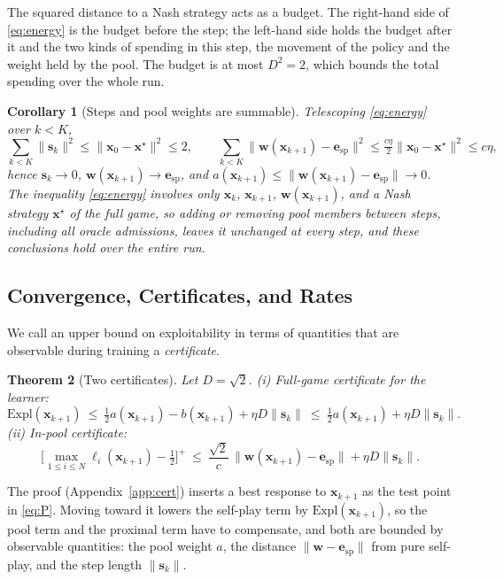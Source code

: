 \documentclass{article}
\theoremstyle{plain}
\newtheorem{theorem}{Theorem}[section]
\newtheorem{corollary}[theorem]{Corollary}
\theoremstyle{remark}
\newcommand{\Expl}{\mathrm{Expl}}
\newcommand{\bx}{{\bm{x}}}
\newcommand{\bw}{{\bm{w}}}
\newcommand{\be}{{\bm{e}}}
\newcommand{\xs}{\bx^{\star}}
\newcommand{\dx}{{\bm{s}}}
\newcommand{\esp}{\be_{\mathrm{sp}}}
\begin{document}
The squared distance to a Nash strategy acts as a budget. The right-hand side of \eqref{eq:energy} is the budget before the step; the left-hand side holds the budget after it and the two kinds of spending in this step, the movement of the policy and the weight held by the pool. The budget is at most $D^2=2$, which bounds the total spending over the whole run.

\begin{corollary}[Steps and pool weights are summable]
\label{cor:sum}
Telescoping \eqref{eq:energy} over $k<K$,
\[
\textstyle\sum_{k<K}\|\dx_k\|^2\le\|\bx_0-\xs\|^2\le2,\qquad
\sum_{k<K}\|\bw(\bx_{k+1})-\esp\|^2\le\tfrac{c\eta}2\|\bx_0-\xs\|^2\le c\eta ,
\]
hence $\dx_k\to0$, $\bw(\bx_{k+1})\to \esp$, and $a(\bx_{k+1})\le\|\bw(\bx_{k+1})-\esp\|\to0$. The inequality \eqref{eq:energy} involves only $\bx_k$, $\bx_{k+1}$, $\bw(\bx_{k+1})$, and a Nash strategy $\xs$ of the full game, so adding or removing pool members between steps, including all oracle admissions, leaves it unchanged at every step, and these conclusions hold over the entire run.
\end{corollary}

\subsection{Convergence, Certificates, and Rates}
\label{sec:conv}

We call an upper bound on exploitability in terms of quantities that are observable during training a \emph{certificate}.

\begin{theorem}[Two certificates]
\label{thm:cert}
Let $D=\sqrt2$. (i) Full-game certificate for the learner:
\[
\Expl(\bx_{k+1})\ \le\ \tfrac12a(\bx_{k+1})-b(\bx_{k+1})+\eta D\|\dx_k\|\ \le\ \tfrac12a(\bx_{k+1})+\eta D\|\dx_k\| .
\]
(ii) In-pool certificate:
\[
\Big[\max_{1\le i\le N}\ell_i(\bx_{k+1})-\tfrac12\Big]^+\ \le\ \frac{\sqrt2}{c}\,\|\bw(\bx_{k+1})-\esp\|+\eta D\|\dx_k\| .
\]
\end{theorem}
The proof (Appendix~\ref{app:cert}) inserts a best response to $\bx_{k+1}$ as the test point in \eqref{eq:P}. Moving toward it lowers the self-play term by $\Expl(\bx_{k+1})$, so the pool term and the proximal term have to compensate, and both are bounded by observable quantities: the pool weight $a$, the distance $\|\bw-\esp\|$ from pure self-play, and the step length $\|\dx_k\|$.
\end{document}
